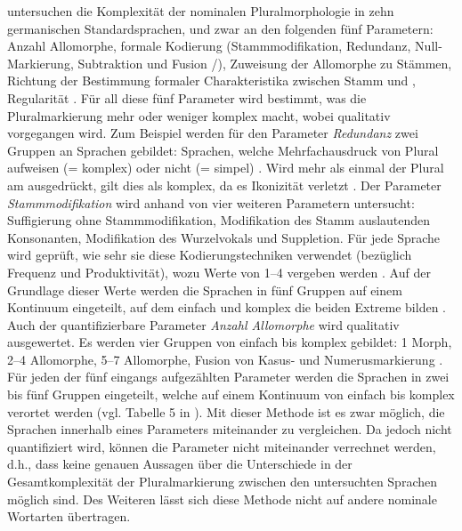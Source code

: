 \begin{exe}
\begin{exe}
{\citet{DammelKürschner2008}} untersuchen die Komplexität der nominalen Pluralmorphologie in zehn germanischen Standardsprachen, und zwar an den folgenden fünf Parametern: Anzahl Allomorphe, formale Kodierung (Stammmodifikation, Redundanz, Null-Markierung, Subtraktion und Fusion /), Zuweisung der Allomorphe zu Stämmen, Richtung der Bestimmung formaler Charakteristika zwischen Stamm und , Regularität \citep[244, 257]{DammelKürschner2008}. Für all diese fünf Parameter wird bestimmt, was die Pluralmarkierung mehr oder weniger komplex macht, wobei qualitativ vorgegangen wird. Zum Beispiel werden für den Parameter \textit{Redundanz} zwei Gruppen an Sprachen gebildet: Sprachen, welche Mehrfachausdruck von Plural aufweisen (= komplex) oder nicht (= simpel) \citep[257]{DammelKürschner2008}. Wird mehr als einmal der Plural am  ausgedrückt, gilt dies als komplex, da es Ikonizität verletzt \citep[255-251]{DammelKürschner2008}. Der Parameter \textit{Stammmodifikation} wird anhand von vier weiteren Parametern untersucht: Suffigierung ohne Stammmodifikation, Modifikation des Stamm auslautenden Konsonanten, Modifikation des Wurzelvokals und Suppletion. Für jede Sprache wird geprüft, wie sehr sie diese Kodierungstechniken verwendet (bezüglich Frequenz und Produktivität), wozu Werte von 1–4 vergeben werden \citep[250]{DammelKürschner2008}. Auf der Grundlage dieser Werte werden die Sprachen in fünf Gruppen auf einem Kontinuum eingeteilt, auf dem einfach und komplex die beiden Extreme bilden \citep[257]{DammelKürschner2008}. Auch der quantifizierbare Parameter \textit{Anzahl Allomorphe} wird qualitativ ausgewertet. Es werden vier Gruppen von einfach bis komplex gebildet: 1 Morph, 2–4 Allomorphe, 5–7 Allomorphe, Fusion von Kasus- und Numerusmarkierung \citep[247]{DammelKürschner2008}. Für jeden der fünf eingangs aufgezählten Parameter werden die Sprachen in zwei bis fünf Gruppen eingeteilt, welche auf einem Kontinuum von einfach bis komplex verortet werden (vgl. Tabelle 5 in \citealt[257]{DammelKürschner2008}). Mit dieser Methode ist es zwar möglich, die Sprachen innerhalb eines Parameters miteinander zu vergleichen. Da jedoch nicht quantifiziert wird, können die Parameter nicht miteinander verrechnet werden, d.h., dass keine genauen Aussagen über die Unterschiede in der Gesamtkomplexität der Pluralmarkierung zwischen den untersuchten Sprachen möglich sind. Des Weiteren lässt sich diese Methode nicht auf andere nominale Wortarten übertragen.


\end{exe}
\end{exe}
